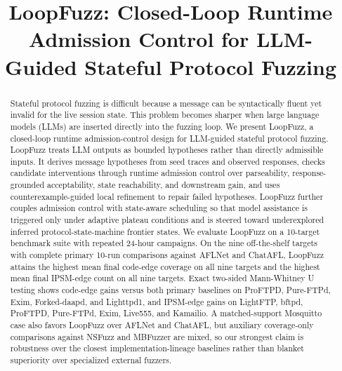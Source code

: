 \documentclass[conference]{IEEEtran}
\begin{document}
\title{LoopFuzz: Closed-Loop Runtime Admission Control for LLM-Guided Stateful Protocol Fuzzing}

\author{
}

\maketitle

\begin{abstract}
Stateful protocol fuzzing is difficult because a message can be syntactically fluent yet invalid for the live session state. This problem becomes sharper when large language models (LLMs) are inserted directly into the fuzzing loop. We present LoopFuzz, a closed-loop runtime admission-control design for LLM-guided stateful protocol fuzzing. LoopFuzz treats LLM outputs as bounded hypotheses rather than directly admissible inputs. It derives message hypotheses from seed traces and observed responses, checks candidate interventions through runtime admission control over parseability, response-grounded acceptability, state reachability, and downstream gain, and uses counterexample-guided local refinement to repair failed hypotheses. LoopFuzz further couples admission control with state-aware scheduling so that model assistance is triggered only under adaptive plateau conditions and is steered toward underexplored inferred protocol-state-machine frontier states. We evaluate LoopFuzz on a 10-target benchmark suite with repeated 24-hour campaigns. On the nine off-the-shelf targets with complete primary 10-run comparisons against AFLNet and ChatAFL, LoopFuzz attains the highest mean final code-edge coverage on all nine targets and the highest mean final IPSM-edge count on all nine targets. Exact two-sided Mann-Whitney U testing shows code-edge gains versus both primary baselines on ProFTPD, Pure-FTPd, Exim, Forked-daapd, and Lighttpd1, and IPSM-edge gains on LightFTP, bftpd, ProFTPD, Pure-FTPd, Exim, Live555, and Kamailio. A matched-support Mosquitto case also favors LoopFuzz over AFLNet and ChatAFL, but auxiliary coverage-only comparisons against NSFuzz and MBFuzzer are mixed, so our strongest claim is robustness over the closest implementation-lineage baselines rather than blanket superiority over specialized external fuzzers.
\end{abstract}
\end{document}

